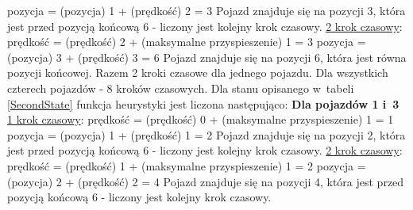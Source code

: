 \newline
pozycja = (pozycja) 1 + (prędkość) 2 = 3
\newline
\newline
Pojazd znajduje się na pozycji 3, która jest przed pozycją końcową 6 - liczony jest kolejny krok czasowy.
\newline
\newline
\underline{2 krok czasowy}:
\newline
\newline
prędkość = (prędkość) 2 + (maksymalne przyspieszenie) 1 = 3
\newline
pozycja = (pozycja) 3 + (prędkość) 3 = 6
\newline
\newline
Pojazd znajduje się na pozycji 6, która jest równa pozycji końcowej.
\newline
\newline
Razem 2 kroki czasowe dla jednego pojazdu. Dla wszystkich czterech pojazdów - 8 kroków czasowych.
\newline
\newline
\newline
Dla stanu opisanego w~tabeli \ref{SecondState} funkcja heurystyki jest liczona następująco:
\newline
\newline
\textbf{Dla pojazdów 1 i~3}
\newline
\newline
\underline{1 krok czasowy}:
\newline
\newline
prędkość = (prędkość) 0 + (maksymalne przyspieszenie) 1 = 1
\newline
pozycja = (pozycja) 1 + (prędkość) 1 = 2
\newline
\newline
Pojazd znajduje się na pozycji 2, która jest przed pozycją końcową 6 - liczony jest kolejny krok czasowy.
\newline
\newline
\underline{2 krok czasowy}:
\newline
\newline
prędkość = (prędkość) 1 + (maksymalne przyspieszenie) 1 = 2
\newline
pozycja = (pozycja) 2 + (prędkość) 2 = 4
\newline
\newline
Pojazd znajduje się na pozycji 4, która jest przed pozycją końcową 6 - liczony jest kolejny krok czasowy.
\newline
